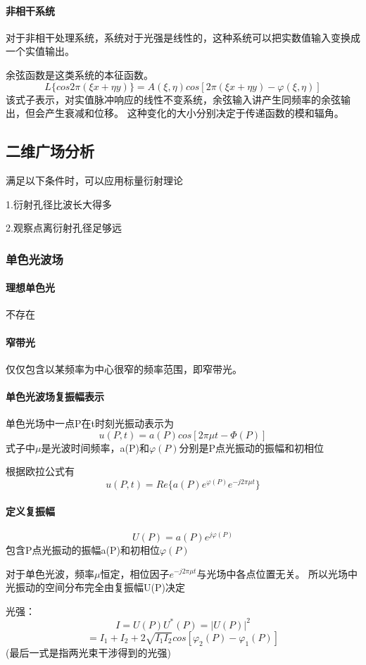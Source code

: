 \documentclass[UTF8]{ctexart}
\begin{document}
\paragraph{非相干系统}对于非相干处理系统，系统对于光强是线性的，这种系统可以把实数值输入变换成一个实值输出。

余弦函数是这类系统的本征函数。
\[L\{cos2\pi(\xi x+\eta y)\}=A(\xi,\eta)cos[2\pi (\xi x+\eta y)-\varphi(\xi,\eta)]
    \]
该式子表示，对实值脉冲响应的线性不变系统，余弦输入讲产生同频率的余弦输出，但会产生衰减和位移。
这种变化的大小分别决定于传递函数的模和辐角。
\subsection{二维广场分析}满足以下条件时，可以应用标量衍射理论

1.衍射孔径比波长大得多

2.观察点离衍射孔径足够远

\subsubsection{单色光波场}
\paragraph{理想单色光} 不存在
\paragraph{窄带光}仅仅包含以某频率为中心很窄的频率范围，即窄带光。
\paragraph{单色光波场复振幅表示}单色光场中一点P在t时刻光振动表示为
\[u(P,t)=a(P)cos[2\pi\mu t-\varPhi(P)]
    \]
式子中$\mu$是光波时间频率，a(P)和$\varphi (P)$分别是P点光振动的振幅和初相位


根据欧拉公式有
\[u(P,t)=Re\{
    a(P)e^{\varphi(P)}e^{-j2\pi\mu t}\}
    \]
\paragraph{定义复振幅}\[
    U(P)=a(P)e^{j\varphi(P)}\]
包含P点光振动的振幅a(P)和初相位$\varphi(P)$

对于单色光波，频率$\mu$恒定，相位因子$e^{-j2\pi\mu t}$与光场中各点位置无关。
所以光场中光振动的空间分布完全由复振幅U(P)决定

光强：\[I=U(P)U^{*}(P)=|U(P)|^2
\]\[
=I_{1}+I_{2}+2\sqrt{I_{1}I_{2}}cos[\varphi_{2}(P)-\varphi_{1}(P)]
\]
(最后一式是指两光束干涉得到的光强)
\end{document}

